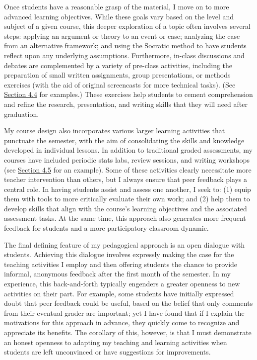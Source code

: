 \documentclass[11pt]{article}
\begin{document}
Once students have a reasonable grasp of the material, I move on to more advanced learning objectives. While these goals vary based on the level and subject of a given course, this deeper exploration of a topic often involves several steps: applying an argument or theory to an event or case; analyzing the case from an alternative framework; and using the Socratic method to have students reflect upon any underlying assumptions. Furthermore, in-class discussions and debates are complemented by a variety of pre-class activities, including the preparation of small written assignments, group presentations, or methods exercises (with the aid of original screencasts for more technical tasks). (See \hyperref[sec:tutorials]{Section 4.4} for examples.) These exercises help students to cement comprehension and refine the research, presentation, and writing skills that they will need after graduation.
    
My course design also incorporates various larger learning activities that punctuate the semester, with the aim of consolidating the skills and knowledge developed in individual lessons. In addition to traditional graded assessments, my courses have included periodic stats labs, review sessions, and writing workshops (see \hyperref[sec:workshop]{Section 4.5} for an example). Some of these activities clearly necessitate more teacher intervention than others, but I always ensure that peer feedback plays a central role. In having students assist and assess one another, I seek to: (1) equip them with tools to more critically evaluate their own work; and (2) help them to develop skills that align with the course's learning objectives and the associated assessment tasks. At the same time, this approach also generates more frequent feedback for students and a more participatory classroom dynamic.
    
The final defining feature of my pedagogical approach is an open dialogue with students. Achieving this dialogue involves expressly making the case for the teaching activities I employ and then offering students the chance to provide informal, anonymous feedback after the first month of the semester. In my experience, this back-and-forth typically engenders a greater openness to new activities on their part. For example, some students have initially expressed doubt that peer feedback could be useful, based on the belief that only comments from their eventual grader are important; yet I have found that if I explain the motivations for this approach in advance, they quickly come to recognize and appreciate its benefits. The corollary of this, however, is that I must demonstrate an honest openness to adapting my teaching and learning activities when students are left unconvinced or have suggestions for improvements. 
\end{document}

